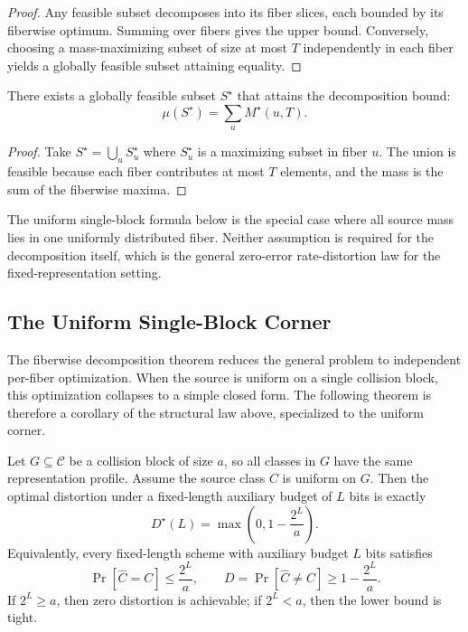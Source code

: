 \begin{proof}
Any feasible subset decomposes into its fiber slices, each bounded by its fiberwise optimum. Summing over fibers gives the upper bound. Conversely, choosing a mass-maximizing subset of size at most $T$ independently in each fiber yields a globally feasible subset attaining equality.
\end{proof}

\begin{corollary}\label{cor:fiberwise-attainment}
There exists a globally feasible subset $S^\star$ that attains the decomposition bound:
\[
\mu(S^\star) = \sum_u M^\star(u, T).
\]
\end{corollary}

\begin{proof}
Take $S^\star = \bigcup_u S^\star_u$ where $S^\star_u$ is a maximizing subset in fiber $u$. The union is feasible because each fiber contributes at most $T$ elements, and the mass is the sum of the fiberwise maxima.
\end{proof}

\begin{remark}
The uniform single-block formula below is the special case where all source mass lies in one uniformly distributed fiber. Neither assumption is required for the decomposition itself, which is the general zero-error rate-distortion law for the fixed-representation setting.
\end{remark}

\subsection{The Uniform Single-Block Corner}

The fiberwise decomposition theorem reduces the general problem to independent per-fiber optimization. When the source is uniform on a single collision block, this optimization collapses to a simple closed form. The following theorem is therefore a corollary of the structural law above, specialized to the uniform corner.

\begin{theorem}\label{thm:semantic-identity-rate-distortion}
Let $G \subseteq \mathcal{C}$ be a collision block of size $a$, so all classes in $G$ have the same representation profile. Assume the source class $C$ is uniform on $G$. Then the optimal distortion under a fixed-length auxiliary budget of $L$ bits is exactly
\[
D^\star(L)=\max\!\left(0, 1 - \frac{2^L}{a}\right).
\]
Equivalently, every fixed-length scheme with auxiliary budget $L$ bits satisfies
\[
\Pr[\hat C = C] \le \frac{2^L}{a},
\qquad
D = \Pr[\hat C \neq C] \ge 1 - \frac{2^L}{a}.
\]
If $2^L \ge a$, then zero distortion is achievable; if $2^L < a$, then the lower bound is tight.
\end{theorem}

